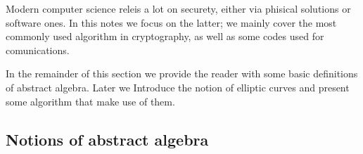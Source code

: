 \documentclass{subfiles}
\begin{document}
    Modern computer science releis a lot on securety, either via phisical solutions
        or software ones. In this notes we focus on the latter; 
        we mainly cover the most commonly used algorithm in cryptography,
        as well as some codes used for comunications.

    In the remainder of this section we provide the reader with some basic definitions 
        of abstract algebra. Later we Introduce the notion of elliptic curves and 
        present some algorithm that make use of them.

    \subsection{Notions of abstract algebra}
    
\end{document}
